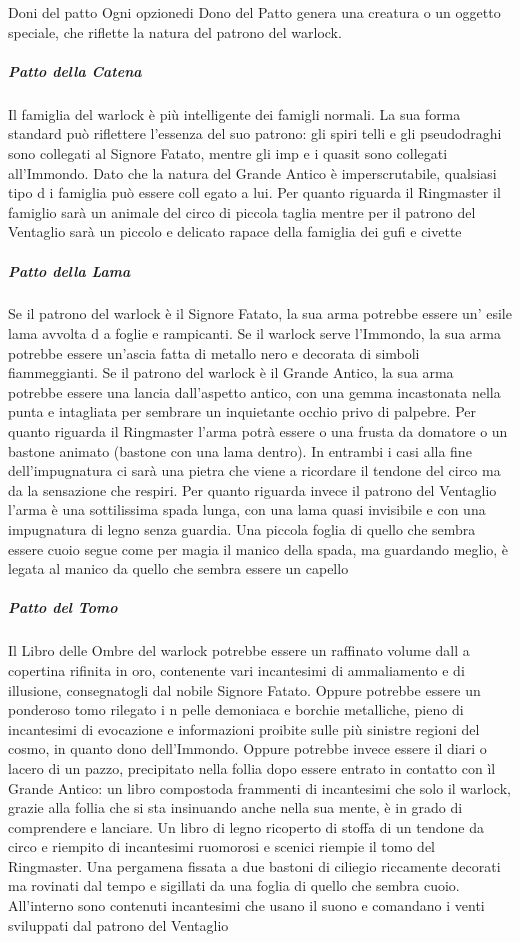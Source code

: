 \documentclass[letterpaper,twocolumn,openany,nodeprecatedcode]{dndbook}
\begin{document}
\begin{DndSidebar}[float=!h]{Doni del patto}
Ogni opzionedi Dono del Patto genera una creatura o un oggetto
speciale, che riflette la natura del patrono del warlock.
\subparagraph{Patto della Catena} Il famiglia del warlock è più intelligente dei famigli normali. La sua forma standard può riflettere l'essenza del suo patrono: gli spiri telli e gli pseudodraghi sono collegati al Signore Fatato, mentre gli imp e i quasit sono collegati all'Immondo. Dato che la natura del Grande Antico è imperscrutabile, qualsiasi tipo d i famiglia può essere coll egato a lui. Per quanto riguarda il Ringmaster il famiglio sarà un animale del circo di piccola taglia mentre per il patrono del Ventaglio sarà un piccolo e delicato rapace della famiglia dei gufi e civette
\subparagraph{Patto della Lama} Se il patrono del warlock è il Signore Fatato, la sua arma potrebbe essere un' esile lama avvolta d a foglie e rampicanti. Se il warlock serve l'Immondo, la sua arma potrebbe essere un'ascia fatta di metallo nero e decorata di simboli fiammeggianti. Se il patrono del warlock è il Grande Antico, la sua arma potrebbe essere una lancia dall'aspetto antico, con una gemma incastonata nella punta e intagliata per sembrare un inquietante occhio privo di palpebre. Per quanto riguarda il Ringmaster l'arma potrà essere o una frusta da domatore o un bastone animato (bastone con una lama dentro). In entrambi i casi alla fine dell'impugnatura ci sarà una pietra che viene a ricordare il tendone del circo ma da la sensazione che respiri. Per quanto riguarda invece il patrono del Ventaglio l'arma è una sottilissima spada lunga, con una lama quasi invisibile e con una impugnatura di legno senza guardia. Una piccola foglia di quello che sembra essere cuoio segue come per magia il manico della spada, ma guardando meglio, è legata al manico da quello che sembra essere un capello
\subparagraph{Patto del Tomo} Il Libro delle Ombre del warlock potrebbe essere un raffinato volume dall a copertina rifinita in oro, contenente vari incantesimi di ammaliamento e di illusione, consegnatogli dal nobile Signore Fatato.
Oppure potrebbe essere un ponderoso tomo rilegato i n pelle demoniaca e borchie metalliche, pieno di incantesimi di evocazione e informazioni proibite sulle più sinistre regioni del cosmo, in quanto dono dell'Immondo. Oppure potrebbe invece essere il diari o lacero di un pazzo, precipitato nella follia dopo essere entrato in contatto con ìl Grande Antico: un libro compostoda frammenti di incantesimi che solo il warlock, grazie alla follia che si sta insinuando anche nella sua mente, è in grado di comprendere e lanciare. Un libro di legno ricoperto di stoffa di un tendone da circo e riempito di incantesimi ruomorosi e scenici riempie il tomo del Ringmaster. Una pergamena fissata a due bastoni di ciliegio riccamente decorati ma rovinati dal tempo e sigillati da una foglia di quello che sembra cuoio. All'interno sono contenuti incantesimi che usano il suono e comandano i venti sviluppati dal patrono del Ventaglio

\end{DndSidebar}
\end{document}
